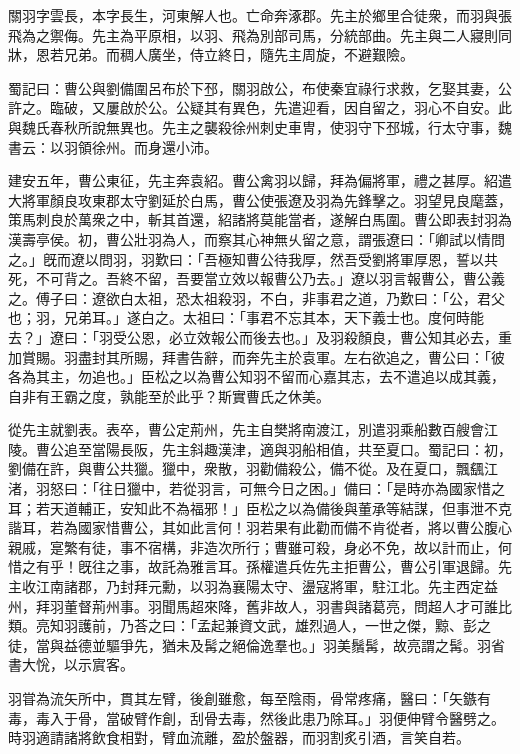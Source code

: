 
\begin{pinyinscope}
關羽字雲長，本字長生，河東解人也。亡命奔涿郡。先主於鄉里合徒衆，而羽與張飛為之禦侮。先主為平原相，以羽、飛為別部司馬，分統部曲。先主與二人寢則同牀，恩若兄弟。而稠人廣坐，侍立終日，隨先主周旋，不避艱險。

蜀記曰：曹公與劉備圍呂布於下邳，關羽啟公，布使秦宜祿行求救，乞娶其妻，公許之。臨破，又屢啟於公。公疑其有異色，先遣迎看，因自留之，羽心不自安。此與魏氏春秋所說無異也。先主之襲殺徐州刺史車冑，使羽守下邳城，行太守事，魏書云：以羽領徐州。而身還小沛。

建安五年，曹公東征，先主奔袁紹。曹公禽羽以歸，拜為偏將軍，禮之甚厚。紹遣大將軍顏良攻東郡太守劉延於白馬，曹公使張遼及羽為先鋒擊之。羽望見良麾蓋，策馬刺良於萬衆之中，斬其首還，紹諸將莫能當者，遂解白馬圍。曹公即表封羽為漢壽亭侯。初，曹公壯羽為人，而察其心神無乆留之意，謂張遼曰：「卿試以情問之。」旣而遼以問羽，羽歎曰：「吾極知曹公待我厚，然吾受劉將軍厚恩，誓以共死，不可背之。吾終不留，吾要當立效以報曹公乃去。」遼以羽言報曹公，曹公義之。傅子曰：遼欲白太祖，恐太祖殺羽，不白，非事君之道，乃歎曰：「公，君父也；羽，兄弟耳。」遂白之。太祖曰：「事君不忘其本，天下義士也。度何時能去？」遼曰：「羽受公恩，必立效報公而後去也。」及羽殺顏良，曹公知其必去，重加賞賜。羽盡封其所賜，拜書告辭，而奔先主於袁軍。左右欲追之，曹公曰：「彼各為其主，勿追也。」臣松之以為曹公知羽不留而心嘉其志，去不遣追以成其義，自非有王霸之度，孰能至於此乎？斯實曹氏之休美。

從先主就劉表。表卒，曹公定荊州，先主自樊將南渡江，別遣羽乘船數百艘會江陵。曹公追至當陽長阪，先主斜趣漢津，適與羽船相值，共至夏口。蜀記曰：初，劉備在許，與曹公共獵。獵中，衆散，羽勸備殺公，備不從。及在夏口，飄颻江渚，羽怒曰：「往日獵中，若從羽言，可無今日之困。」備曰：「是時亦為國家惜之耳；若天道輔正，安知此不為福邪！」臣松之以為備後與董承等結謀，但事泄不克諧耳，若為國家惜曹公，其如此言何！羽若果有此勸而備不肯從者，將以曹公腹心親戚，寔繁有徒，事不宿構，非造次所行；曹雖可殺，身必不免，故以計而止，何惜之有乎！旣往之事，故託為雅言耳。孫權遣兵佐先主拒曹公，曹公引軍退歸。先主收江南諸郡，乃封拜元勳，以羽為襄陽太守、盪寇將軍，駐江北。先主西定益州，拜羽董督荊州事。羽聞馬超來降，舊非故人，羽書與諸葛亮，問超人才可誰比類。亮知羽護前，乃荅之曰：「孟起兼資文武，雄烈過人，一世之傑，黥、彭之徒，當與益德並驅爭先，猶未及髯之絕倫逸羣也。」羽美鬚髯，故亮謂之髯。羽省書大恱，以示賔客。

羽甞為流矢所中，貫其左臂，後創雖愈，每至陰雨，骨常疼痛，醫曰：「矢鏃有毒，毒入于骨，當破臂作創，刮骨去毒，然後此患乃除耳。」羽便伸臂令醫劈之。時羽適請諸將飲食相對，臂血流離，盈於盤器，而羽割炙引酒，言笑自若。


\end{pinyinscope}
